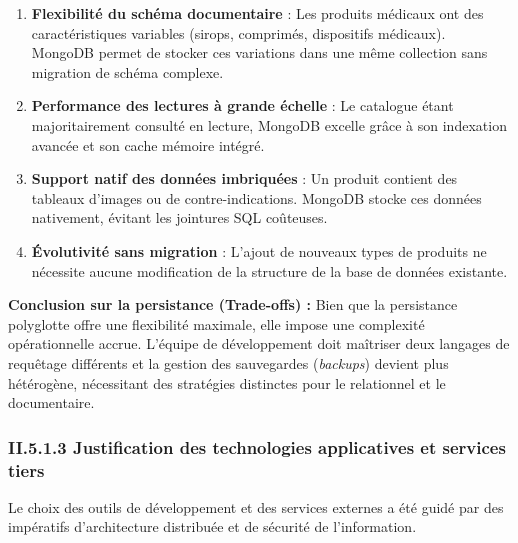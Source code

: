 \begin{enumerate}[label=\alph*)]
    \item \textbf{Flexibilité du schéma documentaire} : Les produits médicaux ont des caractéristiques variables (sirops, comprimés, dispositifs médicaux). MongoDB permet de stocker ces variations dans une même collection sans migration de schéma complexe.

    \item \textbf{Performance des lectures à grande échelle} : Le catalogue étant majoritairement consulté en lecture, MongoDB excelle grâce à son indexation avancée et son cache mémoire intégré.

    \item \textbf{Support natif des données imbriquées} : Un produit contient des tableaux d'images ou de contre-indications. MongoDB stocke ces données nativement, évitant les jointures SQL coûteuses.

    \item \textbf{Évolutivité sans migration} : L'ajout de nouveaux types de produits ne nécessite aucune modification de la structure de la base de données existante.
\end{enumerate}

\textbf{Conclusion sur la persistance (Trade-offs) :}
Bien que la persistance polyglotte offre une flexibilité maximale, elle impose une complexité opérationnelle accrue. L'équipe de développement doit maîtriser deux langages de requêtage différents et la gestion des sauvegardes (\textit{backups}) devient plus hétérogène, nécessitant des stratégies distinctes pour le relationnel et le documentaire.

\subsubsection{II.5.1.3 Justification des technologies applicatives et services tiers}

Le choix des outils de développement et des services externes a été guidé par des impératifs d'architecture distribuée et de sécurité de l'information.


